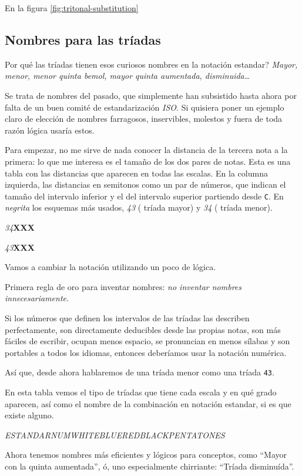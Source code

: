 \documentclass[]{article}
\begin{document}
  En la figura \ref{fig:tritonal-substitution} 

\subsection{Nombres para las tríadas}

Por qué las tríadas tienen esos curiosos nombres en la notación estandar? \emph{Mayor, menor, menor quinta bemol, mayor quinta   aumentada, disminuida\ldots{}}

Se trata de nombres del pasado, que simplemente han subsistido hasta ahora por falta de un buen comité de estandarización \emph{ISO}. Si quisiera poner un ejemplo claro de elección de nombres farragosos, inservibles, molestos y fuera de toda razón lógica usaría estos.

Para empezar, no me sirve de nada conocer la distancia de la tercera nota a la primera: lo que me interesa es el tamaño de los dos pares de notas. Esta es una tabla con las distancias que aparecen en todas las escalas. En la columna izquierda, las distancias en semitonos como un par de números, que indican el tamaño del intervalo inferior y el del intervalo superior partiendo desde \texttt{C}. En \emph{negrita} los esquemas más usados, \emph{43} ( tríada mayor) y \emph{34} ( tríada menor).

\emph{34}\textbf{X}\textbf{X}\textbf{X}

\emph{43}\textbf{X}\textbf{X}\textbf{X}

Vamos a cambiar la notación utilizando un poco de lógica.

Primera regla de oro para inventar nombres: \emph{no inventar nombres   innecesariamente.}

Si los números que definen los intervalos de las tríadas las describen perfectamente, son directamente deducibles desde las propias notas, son más fáciles de escribir, ocupan menos espacio, se pronuncian en menos sílabas y son portables a todos los idiomas, entonces deberíamos usar la notación numérica.

Así que, desde ahora hablaremos de una tríada menor como una tríada \texttt{43}.

En esta tabla vemos el tipo de tríadas que tiene cada escala y en qué grado aparecen, así como el nombre de la combinación en notación estandar, si es que existe alguno.

\emph{ESTANDAR}\emph{NUM}\emph{WHITE}\emph{BLUE}\emph{RED}\emph{BLACK}\emph{PENTA}\emph{TONES}

Ahora tenemos nombres más eficientes y lógicos para conceptos, como ``Mayor con la quinta aumentada'', ó, uno especialmente chirriante: ``Tríada disminuída''.
\end{document}
